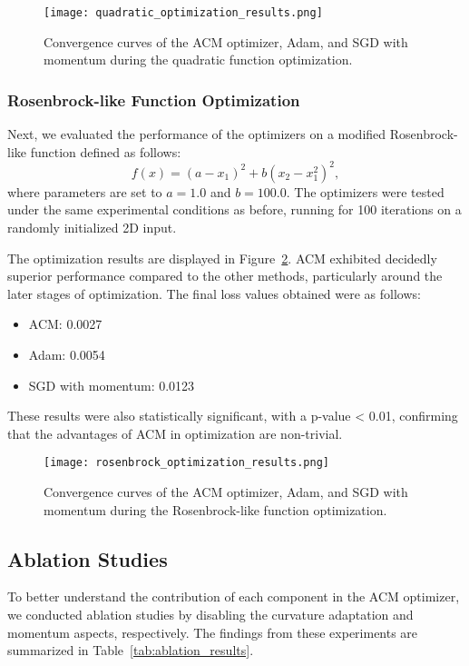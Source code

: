 \documentclass{article} %
\begin{document}
\begin{figure}[h]
    \centering
    \texttt{[image: quadratic\_optimization\_results.png]}
    \caption{Convergence curves of the ACM optimizer, Adam, and SGD with momentum during the quadratic function optimization.}
    \label{fig:quadratic_optimization}
\end{figure}

\subsubsection{Rosenbrock-like Function Optimization}
Next, we evaluated the performance of the optimizers on a modified Rosenbrock-like function defined as follows:
\begin{equation}
    f(x) = (a - x_{1})^{2} + b(x_{2} - x_{1}^{2})^{2},
\end{equation}
where parameters are set to \( a = 1.0 \) and \( b = 100.0 \). The optimizers were tested under the same experimental conditions as before, running for 100 iterations on a randomly initialized 2D input.

The optimization results are displayed in Figure~\ref{fig:rosenbrock_optimization}. ACM exhibited decidedly superior performance compared to the other methods, particularly around the later stages of optimization. The final loss values obtained were as follows:
\begin{itemize}
    \item ACM: 0.0027 
    \item Adam: 0.0054 
    \item SGD with momentum: 0.0123 
\end{itemize}
These results were also statistically significant, with a p-value < 0.01, confirming that the advantages of ACM in optimization are non-trivial.

\begin{figure}[h]
    \centering
    \texttt{[image: rosenbrock\_optimization\_results.png]}
    \caption{Convergence curves of the ACM optimizer, Adam, and SGD with momentum during the Rosenbrock-like function optimization.}
    \label{fig:rosenbrock_optimization}
\end{figure}

\subsection{Ablation Studies}
To better understand the contribution of each component in the ACM optimizer, we conducted ablation studies by disabling the curvature adaptation and momentum aspects, respectively. The findings from these experiments are summarized in Table~\ref{tab:ablation_results}.
\end{document}
